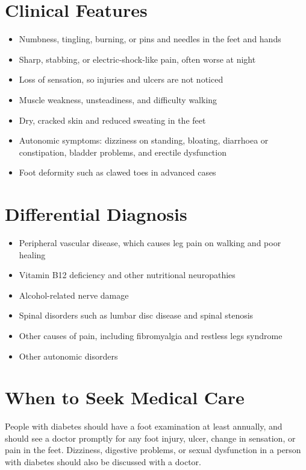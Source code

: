 \section*{Clinical Features}
\begin{itemize}
    \item Numbness, tingling, burning, or pins and needles in the feet and hands
    \item Sharp, stabbing, or electric-shock-like pain, often worse at night
    \item Loss of sensation, so injuries and ulcers are not noticed
    \item Muscle weakness, unsteadiness, and difficulty walking
    \item Dry, cracked skin and reduced sweating in the feet
    \item Autonomic symptoms: dizziness on standing, bloating, diarrhoea or constipation, bladder problems, and erectile dysfunction
    \item Foot deformity such as clawed toes in advanced cases
\end{itemize}

\section*{Differential Diagnosis}
\begin{itemize}
    \item Peripheral vascular disease, which causes leg pain on walking and poor healing
    \item Vitamin B12 deficiency and other nutritional neuropathies
    \item Alcohol-related nerve damage
    \item Spinal disorders such as lumbar disc disease and spinal stenosis
    \item Other causes of pain, including fibromyalgia and restless legs syndrome
    \item Other autonomic disorders
\end{itemize}

\section*{When to Seek Medical Care}
People with diabetes should have a foot examination at least annually, and should see a doctor promptly for any foot injury, ulcer, change in sensation, or pain in the feet. Dizziness, digestive problems, or sexual dysfunction in a person with diabetes should also be discussed with a doctor.

